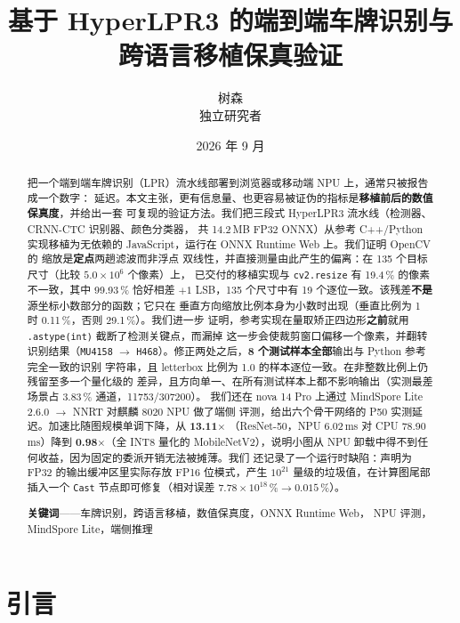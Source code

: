 \documentclass[UTF8,a4paper,11pt]{ctexart}
\title{\bfseries 基于 HyperLPR3 的端到端车牌识别与跨语言移植保真验证}
\author{树森\\[2pt]\small 独立研究者}
\date{2026 年 9 月}
\begin{document}
\maketitle

\begin{abstract}
\noindent
把一个端到端车牌识别（LPR）流水线部署到浏览器或移动端 NPU 上，通常只被报告成一个数字：
延迟。本文主张，更有信息量、也更容易被证伪的指标是\textbf{移植前后的数值保真度}，并给出一套
可复现的验证方法。我们把三段式 HyperLPR3 流水线（检测器、CRNN-CTC 识别器、颜色分类器，
共 14.2\,MB FP32 ONNX）从参考 C++/Python 实现移植为无依赖的 JavaScript，运行在 ONNX
Runtime Web 上。我们证明 OpenCV 的  缩放是\textbf{定点}两趟滤波而非浮点
双线性，并直接测量由此产生的偏离：在 135 个目标尺寸（比较 $5.0\times10^{6}$ 个像素）上，
已交付的移植实现与 \texttt{cv2.resize} 有 19.4\,\% 的像素不一致，其中 99.93\,\% 恰好相差
$+1$ LSB，135 个尺寸中有 19 个逐位一致。该残差\textbf{不是}源坐标小数部分的函数；它只在
垂直方向缩放比例本身为小数时出现（垂直比例为 1 时 0.11\,\%，否则 29.1\,\%）。我们进一步
证明，参考实现在量取矫正四边形\textbf{之前}就用 \texttt{.astype(int)} 截断了检测关键点，而漏掉
这一步会使裁剪窗口偏移一个像素，并翻转识别结果（\texttt{MU4158} $\rightarrow$
\texttt{H468}）。修正两处之后，\textbf{8 个测试样本全部}输出与 Python 参考完全一致的识别
字符串，且 letterbox 比例为 1.0 的样本逐位一致。在非整数比例上仍残留至多一个量化级的
差异，且方向单一、在所有测试样本上都不影响输出（实测最差场景占 3.83\,\% 通道，11753/307200）。
我们还在 nova 14 Pro 上通过 MindSpore Lite 2.6.0 $\rightarrow$ NNRT 对麒麟 8020 NPU 做了端侧
评测，给出六个骨干网络的 P50 实测延迟。加速比随图规模单调下降，从 \textbf{13.11$\times$}
（ResNet-50，NPU 6.02\,ms 对 CPU 78.90\,ms）降到 \textbf{0.98$\times$}（全 INT8 量化的
MobileNetV2），说明小图从 NPU 卸载中得不到任何收益，因为固定的委派开销无法被摊薄。我们
还记录了一个运行时缺陷：声明为 FP32 的输出缓冲区里实际存放 FP16 位模式，产生 $10^{21}$
量级的垃圾值，在计算图尾部插入一个 \texttt{Cast} 节点即可修复（相对误差
$7.78\times10^{18}\,\% \rightarrow 0.015\,\%$）。

\vspace{4pt}
\noindent\textbf{关键词}——车牌识别，跨语言移植，数值保真度，ONNX Runtime Web，
NPU 评测，MindSpore Lite，端侧推理
\end{abstract}

\section{引言}
\end{document}
